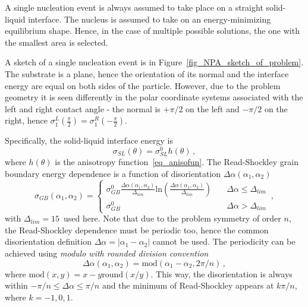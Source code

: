 	A single nucleation event is always assumed to take place on a straight solid-liquid interface. The nucleus is assumed to take on an energy-minimizing equilibrium shape. Hence, in the case of multiple possible solutions, the one with the smallest area is selected. 
	
	A sketch of a single nucleation event is in Figure~\ref{fig_NPA_sketch_of_problem}. The substrate is a plane, hence the orientation of its normal and the interface energy are equal on both sides of the particle. However, due to the problem geometry it is seen differently in the polar coordinate systems associated with the left and right contact angle - the normal is $+\pi/2$ on the left and $-\pi/2$ on the right, hence $\sigma_{1}^L\left(\frac{\pi}{2}\right)=\sigma_{1}^R\left(-\frac{\pi}{2}\right)$. 
	
	Specifically, the solid-liquid interface energy is
	\begin{equation}
		\sigma_{SL}(\theta)=\sigma_{SL}^0h(\theta) \,,
	\end{equation}
	where $h(\theta)$ is the anisotropy function~\eqref{eq_anisofun}. The Read-Shockley grain boundary energy dependence is a function of disorientation $\Delta\alpha(\alpha_1,\alpha_2)$
	\begin{equation}\label{eq_GBE_read_shockley}
		\sigma_{GB}(\alpha_1,\alpha_2) = \left\{ \begin{array}{ll}
			\sigma_{GB}^0\frac{\Delta\alpha(\alpha_1,\alpha_2)}{\Delta_{lim}}\mathrm{ln}\left(\frac{\Delta\alpha(\alpha_1,\alpha_2)}{\Delta_{lim}}\right) & \quad \Delta\alpha\leq \Delta_{lim} \\
			\sigma_{GB}^0 & \quad\Delta\alpha> \Delta_{lim}
		\end{array} \right. \,,
	\end{equation}
	with $\Delta_{lim}=15$\textdegree~used here. Note that due to the problem symmetry of order $n$, the Read-Shockley dependence must be periodic too, hence the common disorientation definition $\Delta\alpha=|\alpha_1-\alpha_2|$ cannot be used. The periodicity can be achieved using \textit{modulo with rounded division convention}~\cite{wiki_modulo}
	\begin{equation}
		\Delta\alpha(\alpha_1,\alpha_2) = \mathrm{mod}(\alpha_1-\alpha_2,2\pi/n) \,, 
	\end{equation}
	where $\mathrm{mod}(x,y)=x-y\mathrm{round}(x/y)$. This way, the disorientation is always within $-\pi/n\leq \Delta\alpha \leq \pi/n$ and the minimum of Read-Shockley appears at  $k\pi/n $, where $k=-1,0,1$.
	
